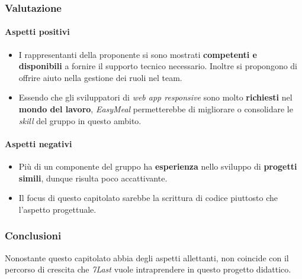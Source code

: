 \documentclass[italian,12pt]{article} %
\begin{document}
\subsubsection{Valutazione}
\paragraph{Aspetti positivi}
\begin{itemize}
	\item I rappresentanti della proponente si sono mostrati \textbf{competenti e disponibili} a fornire il supporto tecnico necessario.
	      Inoltre si propongono di offrire aiuto nella gestione dei ruoli nel team.
	\item Essendo che gli sviluppatori di \textit{web app responsive} sono molto \textbf{richiesti} nel \textbf{mondo del lavoro}, \textit{EasyMeal} permetterebbe
	      di migliorare o consolidare le \textit{skill} del gruppo in questo ambito.
\end{itemize}
\paragraph{Aspetti negativi}
\begin{itemize}
	\item Più di un componente del gruppo ha \textbf{esperienza} nello sviluppo di \textbf{progetti simili}, dunque risulta poco accattivante.
	\item Il focus di questo capitolato sarebbe la scrittura di codice piuttosto che l'aspetto progettuale.
\end{itemize}

\subsubsection{Conclusioni}
Nonostante questo capitolato abbia degli aspetti allettanti, non coincide con il percorso di crescita
che \textit{7Last} vuole intraprendere in questo progetto didattico.
\end{document}
